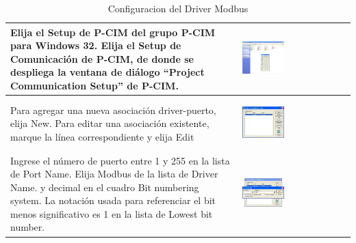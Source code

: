 \begin{itemize}
\begin{table}[ht]
\begin{tabular}{*{2}{m{}}}
  \hline
    Elija el Setup de P-CIM del grupo P-CIM para Windows 32.
    Elija el Setup de Comunicación de P-CIM, de donde se despliega la ventana 
    de diálogo ``Project Communication Setup'' de P-CIM.
    &\begin{center}
      \includegraphics[width=0.4\textwidth]
	{Cap5-SCADA/images/SetupPCIM.JPG}
    \end{center}\\
  \hline
    Para agregar una nueva asociación driver-puerto, elija New.
    Para editar una asociación existente, marque la línea correspondiente
    y elija Edit
    &\begin{center}
       \includegraphics[width=0.4\textwidth]
	{Cap5-SCADA/images/commSetup.jpeg}
    \end{center}\\
  \hline
    Ingrese el número de puerto entre 1 y 255 en la lista de Port Name.
    Elija Modbus de la lista de Driver Name.
    y decimal en el cuadro Bit numbering system.
    La notación usada para referenciar el bit menos significativo es 1 en 
    la lista de Lowest bit number.
    &\begin{center}
       \includegraphics[width=0.4\textwidth]
	{Cap5-SCADA/images/portProp.jpeg}
    \end{center}\\
  \hline
  \end{tabular}
  \caption{Configuracion del Driver Modbus}
  \label{tab:ConfigModbus}
  \end{table}
 

\end{itemize}
